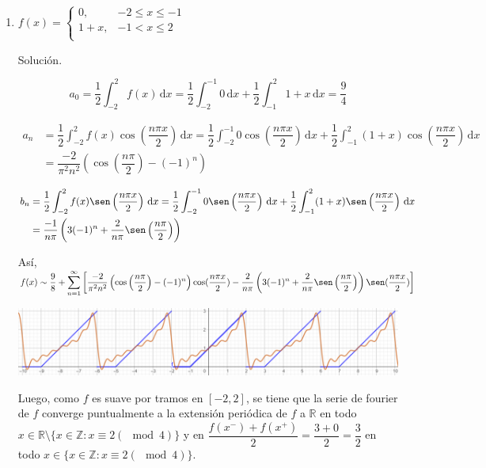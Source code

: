 \documentclass[fleqn]{article}
\newcommand{\real}{\mathbb{R}}
\newcommand{\ent}{\mathbb{Z}}
\newcommand{\intg}[3]{\int_{#1}^{#2} #3 \, \mathrm{d}x}
\begin{document}
\begin{enumerate}[I.]
\begin{enumerate}[(1)]
			\bfseries
			\item $ f(x) = \begin{cases}
				0, & -2 \leq x \leq -1 \\
				1 + x, & -1 < x \leq 2 \\
			\end{cases} $
			
			Solución.

			\normalfont

			\begin{equation*}
				a_0 = \dfrac{1}{2} \intg{-2}{2}{f(x)} = \dfrac{1}{2} \intg{-2}{-1}{0} + \dfrac{1}{2} \intg{-1}{2}{1 + x} = \dfrac{9}{4}
			\end{equation*}

			\begin{align*}
				a_n &= \dfrac{1}{2} \intg{-2}{2}{f(x) \cos \left( \dfrac{n \pi x}{2} \right)} = \dfrac{1}{2} \intg{-2}{-1}{0 \cos \left( \dfrac{n \pi x}{2} \right)} + \dfrac{1}{2} \intg{-1}{2}{(1 + x) \cos \left( \dfrac{n \pi x}{2} \right)} \\
				&= \dfrac{-2}{\pi^2 n^2} \left( \cos \left( \dfrac{n \pi}{2} \right) - (-1)^n \right)
			\end{align*}

			\begin{align*}
				b_n &= \dfrac{1}{2} \intg{-2}{2}{f(x) \sen \left( \dfrac{n \pi x}{2} \right)} = \dfrac{1}{2} \intg{-2}{-1}{0 \sen \left( \dfrac{n \pi x}{2} \right)} + \dfrac{1}{2} \intg{-1}{2}{(1 + x) \sen \left( \dfrac{n \pi x}{2} \right)} \\
				&= \dfrac{-1}{n \pi} \left( 3(-1)^n + \dfrac{2}{n \pi} \sen \left( \dfrac{n \pi}{2} \right) \right)
			\end{align*}

			Así, $ \displaystyle f(x) \sim \dfrac{9}{8} + \sum_{n=1}^{\infty} \left[ \dfrac{-2}{\pi^2 n^2} \left( \cos \left( \dfrac{n \pi}{2} \right) - (-1)^n \right) \cos (\dfrac{n \pi x}{2}) - \dfrac{2}{n \pi} \left( 3(-1)^n + \dfrac{2}{n \pi} \sen \left( \dfrac{n \pi}{2} \right) \right) \sen (\dfrac{n \pi x}{2}) \right] $

			\includegraphics[width=\linewidth]{Ejer5.png}

			Luego, como $f$ es suave por tramos en $ [-2,2] $, se tiene que la serie de fourier de $f$ converge puntualmente a la extensión periódica de $f$ a $ \real $ en todo $ x \in \real \setminus \{ x \in \ent \colon x \equiv 2 (\! \mod 4) \} $ y en $ \dfrac{f(x^-) + f(x^+)}{2} = \dfrac{3+0}{2} = \dfrac{3}{2} $ en todo $ x \in \{ x \in \ent \colon x \equiv 2 (\! \mod 4) \} $.


\end{enumerate}
\end{enumerate}
\end{document}
